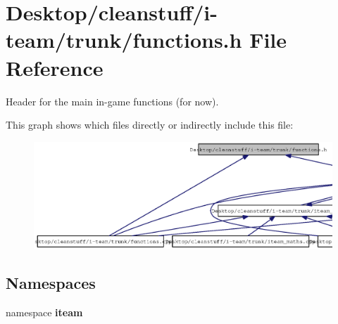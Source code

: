 \section{Desktop/cleanstuff/i-team/trunk/functions.h File Reference}
\label{functions_8h}
Header for the main in-game functions (for now). 



This graph shows which files directly or indirectly include this file:\nopagebreak
\begin{figure}[H]
\begin{center}
\leavevmode
\includegraphics[width=420pt]{functions_8h__dep__incl}
\end{center}
\end{figure}
\subsection*{Namespaces}
\begin{CompactItemize}
\item 
namespace {\bf iteam}
\end{CompactItemize}
